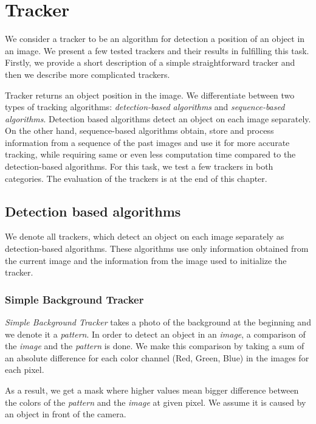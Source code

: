 \chapter{Tracker}
\label{ch:tracker}

We consider a tracker to be an algorithm for detection a position of an object in
an image. We present a few tested trackers and their results in fulfilling this task.
Firstly, we provide a short description of a simple straightforward tracker and
then we describe more complicated trackers.

Tracker returns an object position in the image. We differentiate between two
types of tracking algorithms: \emph{detection-based algorithms} and
\emph{sequence-based algorithms}. Detection based algorithms detect an object
on each image separately. On the other hand, sequence-based algorithms obtain,
store and process information from a sequence of the past images and use it
for more accurate tracking, while requiring same or even less computation time
compared to the detection-based algorithms. For this task, we test a few trackers
in both categories. The evaluation of the trackers is at the end of this chapter.


\section {Detection based algorithms}

We denote all trackers, which detect an object on each image separately as
detection-based algorithms. These algorithms use only information obtained from
the current image and the information from the image used to initialize the tracker.

\subsection{Simple Background Tracker}

\emph{Simple Background Tracker} takes a photo of the background at the
beginning and we denote it a \emph{pattern}. In order to detect an object in
an \emph{image}, a comparison of the \emph{image} and the \emph{pattern} is done.
We make this comparison by taking a sum of an absolute difference for each
color channel (Red, Green, Blue) in the images for each pixel.

As a result, we get a mask where higher values mean bigger difference between
the colors of the \emph{pattern} and the \emph{image} at given pixel. We assume it
is caused by an object in front of the camera.

